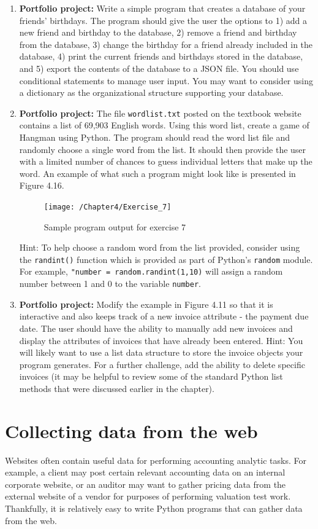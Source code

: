 \documentclass{book}
\begin{document}
\begin{enumerate}
	\item \textbf{Portfolio project:} Write a simple program that creates a database of your friends' birthdays. The program should give the user the options to 1) add a new friend and birthday to the database, 2) remove a friend and birthday from the database, 3) change the birthday for a friend already included in the database, 4) print the current friends and birthdays stored in the database, and 5) export the contents of the database to a JSON file. You should use conditional statements to manage user input. You may want to consider using a dictionary as the organizational structure supporting your database.
	
	\item \textbf{Portfolio project:} The file \texttt{wordlist.txt} posted on the textbook website contains a list of 69,903 English words. Using this word list, create a game of Hangman using Python. The program should read the word list file and randomly choose a single word from the list. It should then provide the user with a limited number of chances to guess individual letters that make up the word. An example of what such a program might look like is presented in Figure 4.16.
	
	\begin{figure}[h]
		\caption{Sample program output for exercise 7}
		\centering\texttt{[image: /Chapter4/Exercise\_7]}
	\end{figure}

	Hint: To help choose a random word from the list provided, consider using the \texttt{randint()} function which is provided as part of Python's \texttt{random} module. For example, \texttt{"number = random.randint(1,10)} will assign a random number between 1 and 0 to the variable \texttt{number}.
	
	\item \textbf{Portfolio project:} Modify the example in Figure 4.11 so that it is interactive and also keeps track of a new invoice attribute - the payment due date. The user should have the ability to manually add new invoices and display the attributes of invoices that have already been entered. Hint: You will likely want to use a list data structure to store the invoice objects your program generates. For a further challenge, add the ability to delete specific invoices (it may be helpful to review some of the standard Python list methods that were discussed earlier in the chapter).
\end{enumerate}

\chapter{Collecting data from the web}
	Websites often contain useful data for performing accounting analytic tasks. For example, a client may post certain relevant accounting data on an internal corporate website, or an auditor may want to gather pricing data from the external website of a vendor for purposes of performing valuation test work. Thankfully, it is relatively easy to write Python programs that can gather data from the web.
	
\end{document}
